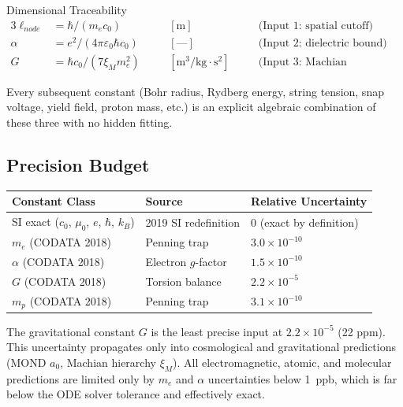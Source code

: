 \begin{resultbox}{Dimensional Traceability}
\begin{alignat*}{3}
\ell_{node} &= \hbar / (m_e c_0) \quad &&[\text{m}] \quad &&\text{(Input 1: spatial cutoff)} \\
\alpha &= e^2 / (4\pi\varepsilon_0 \hbar c_0) \quad &&[\text{---}] \quad &&\text{(Input 2: dielectric bound)} \\
G &= \hbar c_0 / (7 \xi_M m_e^2) \quad &&[\text{m}^3/\text{kg}\cdot\text{s}^2] \quad &&\text{(Input 3: Machian boundary)}
\end{alignat*}
\end{resultbox}

Every subsequent constant (Bohr radius, Rydberg energy, string tension, snap voltage, yield field, proton mass, etc.) is an explicit algebraic combination of these three with no hidden fitting.

\subsection{Precision Budget}

\begin{center}
\small
\renewcommand{\arraystretch}{1.2}
\begin{tabular}{lll}
\toprule
\textbf{Constant Class} & \textbf{Source} & \textbf{Relative Uncertainty} \\
\midrule
SI exact ($c_0$, $\mu_0$, $e$, $\hbar$, $k_B$) & 2019 SI redefinition & 0 (exact by definition) \\
$m_e$ (CODATA 2018) & Penning trap & $3.0 \times 10^{-10}$ \\
$\alpha$ (CODATA 2018) & Electron $g$-factor & $1.5 \times 10^{-10}$ \\
$G$ (CODATA 2018) & Torsion balance & $2.2 \times 10^{-5}$ \\
$m_p$ (CODATA 2018) & Penning trap & $3.1 \times 10^{-10}$ \\
\bottomrule
\end{tabular}
\end{center}

The gravitational constant $G$ is the least precise input at $2.2 \times 10^{-5}$ (22 ppm).  This uncertainty propagates only into cosmological and gravitational predictions (MOND $a_0$, Machian hierarchy $\xi_M$).  All electromagnetic, atomic, and molecular predictions are limited only by $m_e$ and $\alpha$ uncertainties below 1~ppb, which is far below the ODE solver tolerance and effectively exact.

